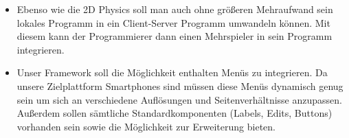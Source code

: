 \begin{itemize}
	\item {}
	
Ebenso wie die 2D Physics soll man auch ohne größeren Mehraufwand sein lokales Programm in ein Client-Server Programm umwandeln können. Mit diesem kann der Programmierer dann einen Mehrspieler in sein Programm integrieren.

	\item {} 
	
Unser Framework soll die Möglichkeit enthalten Menüs zu integrieren. Da unsere Zielplattform Smartphones sind müssen diese Menüs dynamisch genug sein um sich an verschiedene Auflösungen und Seitenverhältnisse anzupassen. Außerdem sollen sämtliche Standardkomponenten (Labels, Edits, Buttons) vorhanden sein sowie die Möglichkeit zur Erweiterung bieten.
\end{itemize}